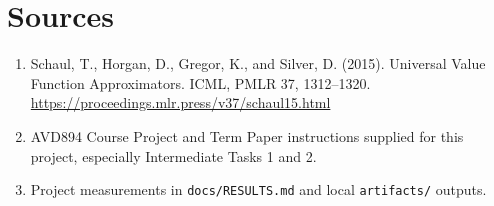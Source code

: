 \documentclass[11pt,a4paper]{article}
\begin{document}
\section{Sources}
\begin{enumerate}
\item Schaul, T., Horgan, D., Gregor, K., and Silver, D. (2015). Universal Value Function Approximators. ICML, PMLR 37, 1312--1320. \url{https://proceedings.mlr.press/v37/schaul15.html}
\item AVD894 Course Project and Term Paper instructions supplied for this project, especially Intermediate Tasks 1 and 2.
\item Project measurements in \texttt{docs/RESULTS.md} and local \texttt{artifacts/} outputs.
\end{enumerate}
\end{document}

